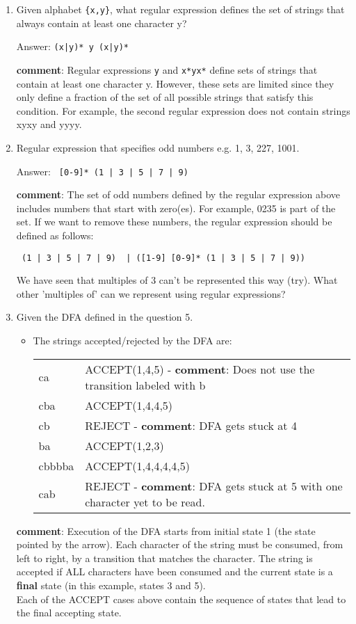 \documentclass{article}
\newcommand{\comment}{\textbf{comment}}
\begin{document}
\begin{enumerate}
\item Given alphabet \verb+{x,y}+, what regular expression defines the set of strings that always contain at least one character y?

Answer: \verb+(x|y)* y (x|y)*+

\comment: Regular expressions \verb+y+ and \verb+x*yx*+ define sets of strings that contain at least one character y. However, these sets are limited since they only define a fraction of the set of all possible strings that satisfy this condition. For example, the second regular expression does not contain strings xyxy and yyyy.

\item Regular expression that specifies odd numbers e.g. 1, 3, 227, 1001.

Answer: \verb+ [0-9]* (1 | 3 | 5 | 7 | 9)+

\comment: The set of odd numbers defined by the regular expression above includes numbers that start with zero(es). For example, 0235 is part of the set. If we want to remove these numbers, the regular expression should be defined as follows:

\verb? (1 | 3 | 5 | 7 | 9)  | ([1-9] [0-9]* (1 | 3 | 5 | 7 | 9))  ?

We have seen that multiples of 3 can't be represented this way (try). What other 'multiples of' can we represent using regular expressions?

\item Given the DFA defined in the question 5.

\begin{itemize}
\item The strings accepted/rejected by the DFA are:

\begin{tabular}{ll}
ca & ACCEPT(1,4,5) - \comment: Does not use the transition labeled with b \\
cba & ACCEPT(1,4,4,5) \\ 
cb & REJECT - \comment: DFA gets stuck at 4 \\
ba & ACCEPT(1,2,3) \\
cbbbba & ACCEPT(1,4,4,4,4,5) \\
cab & REJECT - \comment: DFA gets stuck at 5 with one character yet to be read.
\end{tabular}
\end{itemize}

\comment: Execution of the DFA starts from initial state 1 (the state pointed by the arrow). Each character of the string must be consumed, from left to right,  by a transition that matches the character. The string is accepted if ALL characters have been consumed and the current state is a \textbf{final} state (in this example, states 3 and 5).\\
Each of the ACCEPT cases above contain the sequence of states that lead to the final accepting state.


\end{enumerate}
\end{document}
